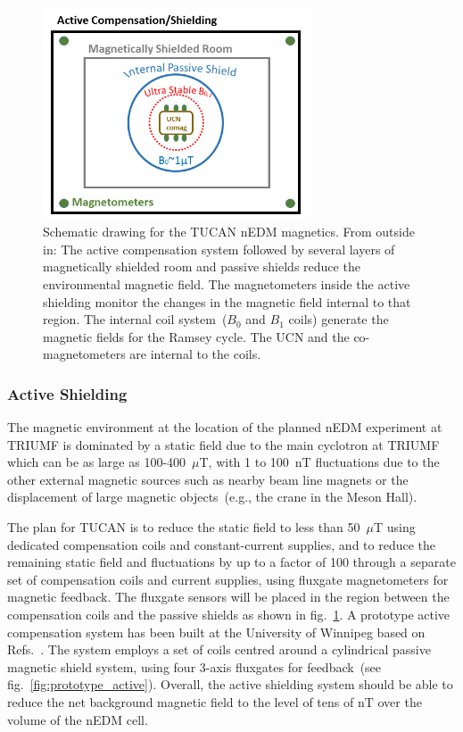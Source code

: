 \begin{figure}[h!]
  \centering
  \includegraphics[width=0.7\textwidth]{magneticscheme.png}
  \caption[Schematic of TUCAN's nEDM magnetics components]{Schematic
    drawing for the TUCAN nEDM magnetics. From outside in: The active
    compensation system followed by several layers of magnetically
    shielded room and passive shields reduce the environmental
    magnetic field. The magnetometers inside the active shielding
    monitor the changes in the magnetic field internal to that
    region. The internal coil system~($B_0$ and $B_1$ coils) generate
    the magnetic fields for the Ramsey cycle. The UCN and the
    co-magnetometers are internal to the coils.  }
  \label{fig:magneticscheme}
\end{figure}



\subsubsection{Active Shielding}

The magnetic environment at the location of the planned nEDM
experiment at TRIUMF is dominated by a static field due to the main
cyclotron at TRIUMF which can be as large as 100-400~$\mu$T, with 1 to
100~nT fluctuations due to the other external magnetic sources such as
nearby beam line magnets or the displacement of large magnetic
objects~(e.g., the crane in the Meson Hall).

The plan for TUCAN is to reduce the static field to less than
50~$\mu$T using dedicated compensation coils and constant-current
supplies,
and to reduce the remaining static field and fluctuations by up to a
factor of 100 through a separate set of compensation coils and current
supplies, using fluxgate magnetometers for magnetic feedback. The
fluxgate sensors will be placed in the region between the compensation
coils and the passive shields as shown in
fig.~\ref{fig:magneticscheme}.  A prototype active compensation system
has been built at the University of Winnipeg based on
Refs.~\cite{beatrice,afach2014dynamic}. The system employs a set of
coils centred around a cylindrical passive magnetic shield system,
using four 3-axis fluxgates for feedback~(see
fig.~\ref{fig:prototype_active}). Overall, the active shielding system
should be able to reduce the net background magnetic field to the
level of tens of nT over the volume of the nEDM cell.


